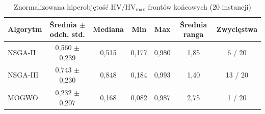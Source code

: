 \begin{table}[htbp]
    \centering
    \caption{Znormalizowana hiperobjętość $\mathrm{HV}/\mathrm{HV}_{\max}$ frontów końcowych (20 instancji)}
    \label{tab:hv_summary}
    \begin{tabular}{l c c c c c c}
        \hline
        Algorytm & Średnia $\pm$ odch. std. & Mediana & Min & Max & Średnia ranga & Zwycięstwa \\
        \hline
        NSGA-II & 0{,}560 $\pm$ 0{,}239 & 0{,}515 & 0{,}177 & 0{,}980 & 1{,}85 & 6 / 20 \\
        NSGA-III & 0{,}743 $\pm$ 0{,}230 & 0{,}848 & 0{,}184 & 0{,}993 & 1{,}40 & 13 / 20 \\
        MOGWO & 0{,}232 $\pm$ 0{,}207 & 0{,}168 & 0{,}082 & 0{,}987 & 2{,}75 & 1 / 20 \\
        \hline
    \end{tabular}
\end{table}
